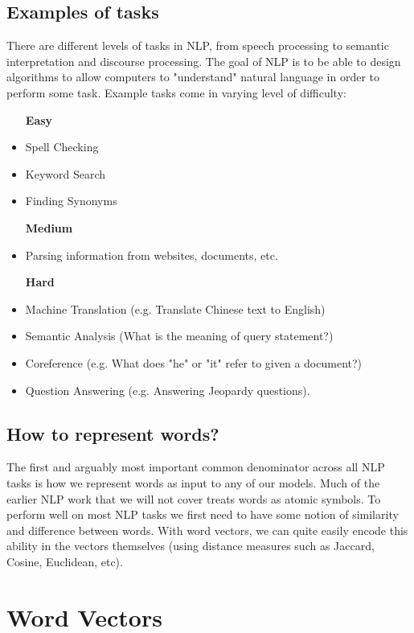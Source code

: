 \documentclass[nobib]{tufte-handout}
\begin{document}
\subsection{Examples of tasks}


There are different levels of tasks in NLP, from speech processing to semantic interpretation and discourse processing. The goal of NLP is to be able to design algorithms to allow computers to "understand" natural language in order to perform some task. Example tasks come in varying level of difficulty:

\begin{itemize}
\item [\textbf{Easy}]
\item Spell Checking
\item Keyword Search
\item Finding Synonyms
\item [\textbf{Medium}]
\item Parsing information from websites, documents, etc.
\item [\textbf{Hard}]
\item Machine Translation (e.g. Translate Chinese text to English)
\item Semantic Analysis (What is the meaning of query statement?)
\item Coreference (e.g. What does "he" or "it" refer to given a document?) 
\item Question Answering (e.g. Answering Jeopardy questions).
\end{itemize}


\subsection{How to represent words?}


The first and arguably most important common denominator across all NLP tasks is how we represent words as input to any of our models. Much of the earlier NLP work that we will not cover treats words as atomic symbols. To perform well on most NLP tasks we first need to have some notion of similarity and difference between words. With word vectors, we can quite easily encode this ability in the vectors themselves (using distance measures such as Jaccard, Cosine, Euclidean, etc).

\section{Word Vectors}\label{sec:wordvectors}
\end{document}

